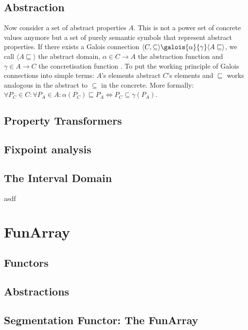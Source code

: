 \documentclass{report}
\begin{document}
\subsection{Abstraction}

Now consider a set of abstract properties $A$. This is not a power set of concrete values anymore but a set of purely semantic symbols that represent abstract properties. If there exists a Galois connection $\langle C,\subseteq\rangle \galois{\alpha}{\gamma}\langle A\sqsubseteq\rangle$, we call $\langle A\sqsubseteq\rangle$ the abstract domain, $\alpha\in C\to A$ the abstraction function and $\gamma\in A\to C$ the concretisation function \cite[chapter 11]{cousot2021}. To put the working principle of Galois connections into simple terms: $A$'s elements abstract $C$'s elements and $\sqsubseteq$ works analogous in the abstract to $\subseteq$ in the concrete. More formally: $\forall P_C\in C:\forall P_A \in A:\alpha(P_C)\sqsubseteq P_A \Longleftrightarrow P_C \subseteq \gamma(P_A)$.



\subsection{Property Transformers}


\subsection{Fixpoint analysis}

\subsection{The Interval Domain}
asdf



\section{FunArray}
\subsection{Functors}
\subsection{Abstractions}
\subsection{Segmentation Functor: The FunArray}
\end{document}
